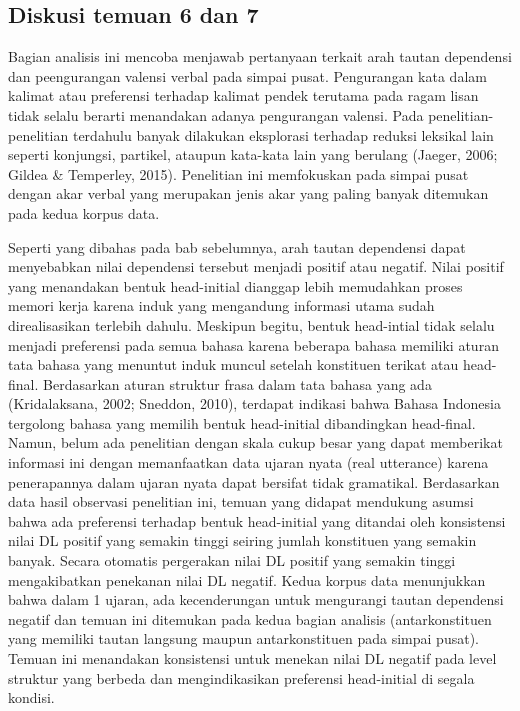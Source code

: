 \subsection{Diskusi temuan 6 dan 7}
Bagian analisis ini mencoba menjawab pertanyaan terkait arah tautan dependensi dan peengurangan valensi verbal pada simpai pusat. Pengurangan kata dalam kalimat atau preferensi terhadap kalimat pendek terutama pada ragam lisan tidak selalu berarti menandakan adanya pengurangan valensi. Pada penelitian-penelitian terdahulu banyak dilakukan eksplorasi terhadap reduksi leksikal lain seperti konjungsi, partikel, ataupun kata-kata lain yang berulang (Jaeger, 2006; Gildea & Temperley, 2015). Penelitian ini memfokuskan pada simpai pusat dengan akar verbal yang merupakan jenis akar yang paling banyak ditemukan pada kedua korpus data. 

Seperti yang dibahas pada bab sebelumnya, arah tautan dependensi dapat menyebabkan nilai dependensi tersebut menjadi positif atau negatif. Nilai positif yang menandakan bentuk head-initial dianggap lebih memudahkan proses memori kerja karena induk yang mengandung informasi utama sudah direalisasikan terlebih dahulu. Meskipun begitu, bentuk head-intial tidak selalu menjadi preferensi pada semua bahasa karena beberapa bahasa memiliki aturan tata bahasa yang menuntut induk muncul setelah konstituen terikat atau head-final. Berdasarkan aturan struktur frasa dalam tata bahasa yang ada (Kridalaksana, 2002; Sneddon, 2010), terdapat indikasi bahwa Bahasa Indonesia tergolong bahasa yang memilih bentuk head-initial dibandingkan head-final. Namun, belum ada penelitian dengan skala cukup besar yang dapat memberikat informasi ini dengan memanfaatkan data ujaran nyata (real utterance) karena penerapannya dalam ujaran nyata dapat bersifat tidak gramatikal.  Berdasarkan data hasil observasi penelitian ini, temuan yang didapat mendukung asumsi bahwa ada preferensi terhadap bentuk head-initial yang ditandai oleh konsistensi nilai DL positif yang semakin tinggi seiring jumlah konstituen yang semakin banyak. Secara otomatis pergerakan nilai DL positif yang semakin tinggi mengakibatkan penekanan nilai DL negatif. Kedua korpus data menunjukkan bahwa dalam 1 ujaran, ada kecenderungan untuk mengurangi tautan dependensi negatif dan temuan ini ditemukan pada kedua bagian analisis (antarkonstituen yang memiliki tautan langsung maupun antarkonstituen pada simpai pusat). Temuan ini menandakan konsistensi untuk menekan nilai DL negatif pada level struktur yang berbeda dan mengindikasikan preferensi head-initial di segala kondisi. 

